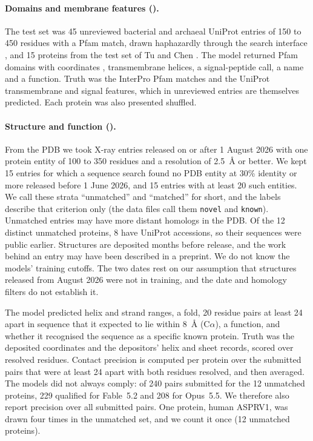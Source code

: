 \documentclass[11pt]{article}
\begin{document}
\paragraph{Domains and membrane features (\tfeat).} The test set was 45 unreviewed bacterial and archaeal
UniProt entries of 150 to 450 residues with a Pfam match, drawn haphazardly through the search interface
\citep{uniprot}, and 15 proteins from the test set of Tu and Chen \citep{tu2026probe}. The model returned
Pfam domains with coordinates \citep{mistry2021pfam}, transmembrane helices, a signal-peptide call, a name
and a function. Truth was the InterPro Pfam matches and the UniProt transmembrane and signal features,
which in unreviewed entries are themselves predicted. Each protein was also presented shuffled.

\paragraph{Structure and function (\tstrfn).} From the PDB \citep{rcsb} we took X-ray entries released on
or after 1 August 2026 with one protein entity of 100 to 350 residues and a resolution of 2.5~\AA{} or
better. We kept 15 entries for which a sequence search found no PDB entity at 30\% identity or more
released before 1 June 2026, and 15 entries with at least 20 such entities. We call these strata
``unmatched'' and ``matched'' for short, and the labels describe that criterion only (the data files call
them \texttt{novel} and \texttt{known}). Unmatched entries may have
more distant homologs in the PDB. Of the 12 distinct unmatched proteins, 8 have UniProt accessions, so their
sequences were public earlier. Structures are deposited months before release, and the work behind an
entry may have been described in a preprint. We do not know the models' training cutoffs. The two dates
rest on our assumption that structures released from August 2026 were not in training, and the date and
homology filters do not establish it.

The model predicted helix and strand ranges, a fold, 20 residue pairs at least 24 apart in sequence that
it expected to lie within 8~\AA{} (C$\alpha$), a function, and whether it recognised the sequence as a
specific known protein. Truth was the deposited coordinates and the depositors' helix and sheet records,
scored over resolved residues. Contact precision is computed per protein over the submitted pairs that
were at least 24 apart with both residues resolved, and then averaged. The models did not always comply:
of 240 pairs submitted for the 12 unmatched proteins, 229 qualified for Fable~5.2 and 208 for Opus~5.5. We
therefore also report precision over all submitted pairs. One protein, human ASPRV1, was drawn four times
in the unmatched set, and we count it once (12 unmatched proteins).
\end{document}
